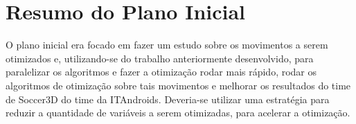 \documentclass[
10pt, %
a4paper, %
oneside, %
headinclude,footinclude, %
BCOR5mm, %
]{scrartcl}
\title{\normalfont\spacedallcaps{Relatório Final de IC}} %
\author{\spacedlowsmallcaps{Francisco Muniz}} %
\date{\today} %
\begin{document}

\renewcommand{\sectionmark}[1]{\markright{\spacedlowsmallcaps{#1}}} %
\lehead{\mbox{\llap{\small\thepage\kern1em\color{halfgray} \vline}\color{halfgray}\hspace{0.5em}\rightmark\hfil}} %

\pagestyle{scrheadings} %



\newpage

\setcounter{tocdepth}{2} %

\tableofcontents %

\listoffigures %

\listoftables %


\newpage %
 

\section{Resumo do Plano Inicial}

O plano inicial era focado em fazer um estudo sobre os movimentos a serem otimizados e, utilizando-se do trabalho anteriormente desenvolvido, para paralelizar os algoritmos e fazer a otimização rodar mais rápido, rodar os algoritmos de otimização sobre tais movimentos e melhorar os resultados do time de Soccer3D do time da ITAndroids.
Deveria-se utilizar uma estratégia para reduzir a quantidade de variáveis a
serem otimizadas, para acelerar a otimização.
\end{document}
